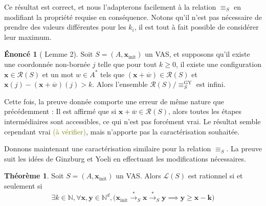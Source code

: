 \documentclass[a4paper,final]{article}
\theoremstyle{definition}
\newtheorem{Theorem}{Théorème}
\newtheorem*{Statement}{Énoncé}
\let\geq\geqslant
\newcommand{\lucas}[1]{\textcolor{olive}{#1}}
\newcommand{\N}{\ensuremath{\mathbb{N}}}
\newcommand{\lang}{\ensuremath{\mathcal{L}}}
\newcommand{\conf}{\ensuremath{\mathcal{R}}}
\newcommand{\trans}[2]{\ensuremath{\stackrel{#1}{\longrightarrow}_{#2}}}
\newcommand{\vect}[1]{\ensuremath{\mathbf{#1}}}
\newcommand{\rel}{\ensuremath{\equiv}}
\newcommand{\relGY}{\ensuremath{\equiv^\text{GY}_S}}
\newcommand{\xinit}{\ensuremath{\vect{x}_\text{init}}}
\newcommand{\valeur}[1]{\ensuremath{\overline{#1}}}
\begin{document}
Ce résultat est correct, et nous l'adapterons facilement à la relation $\rel_S$ en modifiant la propriété requise en conséquence.
Notons qu'il n'est pas nécessaire de prendre des valeurs différentes pour les $k_i$, il est tout à fait possible de considérer leur maximum.

\begin{Statement}[\cite{giyo80} Lemme 2]
    Soit $S=(A,\xinit)$ un VAS, et supposons qu'il existe une coordonnée non-bornée $j$ telle que 
    pour tout $k\geq 0$, il existe une configuration $\vect{x}\in\conf(S)$ et un mot $w\in A^\ast$ tels que 
    $(\vect{x} +\valeur{w}) \in\conf(S)$ et $\vect{x}(j) - (\vect{x} +\valeur{w})(j) > k$.
    Alors l'ensemble $\conf(S)/\relGY$ est infini.
\end{Statement}

Cette fois, la preuve donnée comporte une erreur de même nature que précédemment :
Il est affirmé que si $\vect{x} +\valeur{w} \in\conf(S)$, alors toutes les étapes intermédiaires sont accessibles, ce qui n'est pas forcément vrai.
Le résultat semble cependant vrai \lucas{(à vérifier)}, mais n'apporte pas la caractérisation souhaitée.

\vspace{5mm}

Donnons maintenant une caractérisation similaire pour la relation $\rel_S$.
La preuve suit les idées de Ginzburg et Yoeli \cite{giyo80} en effectuant les modifications nécessaires.

\begin{Theorem}\label{caractérisation}
    Soit $S=(A,\xinit)$ un VAS.
    Alors $\lang(S)$ est rationnel si et seulement si
    \begin{equation}
        \exists k\in\N, \forall \vect{x},\vect{y}\in\N^d, 
\big( \xinit\trans{*}{S} \vect{x} \trans{*}{S} \vect{y}\implies
\vect{y}\geq \vect{x} -\vect{k} \big)
    \label{eq:caracterisation}
    \end{equation}
\end{Theorem}
\end{document}
